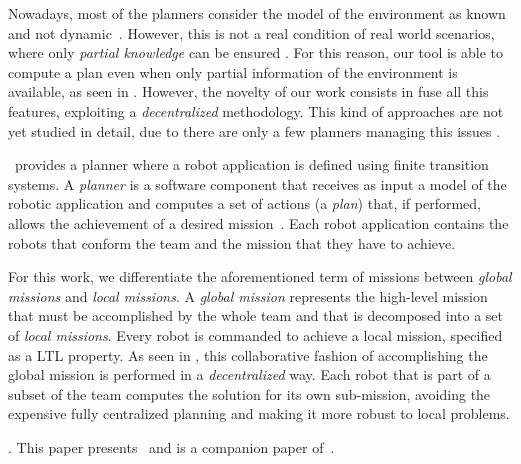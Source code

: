 Nowadays, most of the planners consider the model of the environment as known and not dynamic~\cite{7139412}. 
However, this is not a real condition of real world scenarios, where only \emph{partial knowledge} can be ensured .
For this reason, our tool  is able to
  compute a plan even when only partial information of the environment is available, as seen in \cite{roy2006planning,du2012robot,diaz2001exploring}.
However, the novelty of our work consists in fuse all this features, exploiting a \emph{decentralized} methodology.
This kind of approaches are not yet studied in detail, due to there are only a few planners managing this issues \cite{guo2015multi}.

\toolName\ provides a planner where a robot application is defined using finite transition systems.
A \emph{planner} is  a software component that receives as input a model of the robotic application and computes  a set of actions (a \emph{plan}) that, if performed, allows the achievement of a desired mission~\cite{latombe2012robot}.
Each robot application contains the robots that conform the team and the mission that they have to achieve.

For this work, we differentiate the aforementioned term of missions between \emph{global missions} and \emph{local missions}.
A \emph{global mission} represents the high-level mission that must be accomplished by the whole team \cite{kloetzer2011multi,loizou2005automated,quottrup2004multi} and that is decomposed into a set of \emph{local missions}\cite{schillinger2016decomposition,guo2015multi,guo2015multi,tumova2016multi}.
Every robot is commanded to achieve a local mission, specified as a LTL property.
As seen in \cite{tumova2016multi}, this collaborative fashion of accomplishing the global mission is performed in a \emph{decentralized} way.
Each robot that is part of a subset of the team computes the solution for its own sub-mission, avoiding the expensive fully centralized planning and making it more robust to local problems.

.
This paper presents \toolName\ and is a companion paper of~\cite{mapmaker17}.

